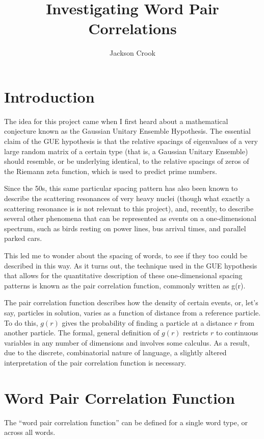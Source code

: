 \documentclass[11pt,letterpaper]{article}
\title{
Investigating Word Pair Correlations
}
\author{
Jackson Crook
}
\theoremstyle{definition}
\begin{document}
\maketitle

\section{Introduction}

The idea for this project came when I first heard about a mathematical conjecture known as the Gaussian Unitary Ensemble Hypothesis. The essential claim of the GUE hypothesis is that the relative spacings of eigenvalues of a very large random matrix of a certain type (that is, a Gaussian Unitary Ensemble) should resemble, or be underlying identical, to the relative spacings of zeros of the Riemann zeta function, which is used to predict prime numbers. 

Since the 50s, this same particular spacing pattern has also been known to describe the scattering resonances of very heavy nuclei (though what exactly a scattering resonance is is not relevant to this project), and, recently, to describe several other phenomena that can be represented as events on a one-dimensional spectrum, such as birds resting on power lines, bus arrival times, and parallel parked cars. 

This led me to wonder about the spacing of words, to see if they too could be described in this way. As it turns out, the technique used in the GUE hypothesis that allows for the quantitative description of these one-dimensional spacing patterns is known as the pair correlation function, commonly written as g(r).

The pair correlation function describes how the density of certain events, or, let's say, particles in solution, varies as a function of distance from a reference particle. To do this, $g(r)$ gives the probability of finding a particle at a distance $r$ from another particle. The formal, general definition of $g(r)$ restricts $r$ to continuous variables in any number of dimensions and involves some calculus. As a result, due to the discrete, combinatorial nature of language, a slightly altered interpretation of the pair correlation function is necessary.

\section{Word Pair Correlation Function}

The ``word pair correlation function'' can be defined for a single word type, or across all words.
\end{document}
